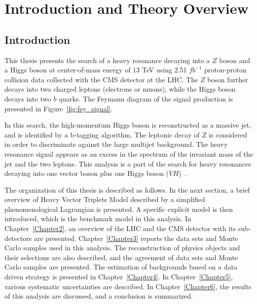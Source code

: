 
\newcommand{\tabhead}[1]{\textbf{#1}}
\newcommand{\mj}{$m_j$ }
\newcommand{\mzh}{$m_{ZH}$ }
\newcommand{\ttbar}{$t\bar{t}$ }
\newcommand{\Zjets}{$Z$+jets }
\newcommand{\Zee}{$Z\rightarrow e^+e^-$ }
\newcommand{\Zmm}{$Z\rightarrow \mu^+\mu^-$ }
\newcommand{\Hbb}{$H\rightarrow b\bar{b}$ }

\chapter{Introduction and Theory Overview} \label{Chapter1}

\section{Introduction}

This thesis presents the search of a heavy resonance decaying into a $Z$ boson and a Higgs boson at center-of-mass energy of 13 TeV using 2.51 $fb^{-1}$ proton-proton collision data collected with the CMS detector at the LHC. The $Z$ boson further decays into two charged leptons (electrons or muons), while the Higgs boson decays into two $b$ quarks. The Feymann diagram of the signal production is presented in Figure~\ref{fig:fey_signal}.

In this search, the high-momentum Higgs boson is reconstructed as a massive jet, and is identified by a b-tagging algorithm. The leptonic decay of $Z$ is considered in order to discriminate against the large multijet background. The heavy resonance signal appears as an excess in the spectrum of the invariant mass of the jet and the two leptons. This analysis is a part of the search for heavy resonances decaying into one vector boson plus one Higgs boson ($VH$)~\cite{Khachatryan:2016cfx}.

The organization of this thesis is described as follows. In the next section, a brief overview of Heavy Vector Triplets Model described by a simplified phenomenological Lagrangian is presented. A specific explicit model is then introduced, which is the benchmark model in this analysis. In Chapter~\ref{Chapter2}, an overview of the LHC and the CMS detector with its sub-detectors are presented. Chapter~\ref{Chapter3} reports the data sets and Monte Carlo samples used in this analysis. The reconstruction of physics objects and their selections are also described, and the agreement of data sets and Monte Carlo samples are presented. The estimation of backgrounds based on a data driven strategy is presented in Chapter~\ref{Chapter4}. In Chapter~\ref{Chapter5}, various systematic uncertainties are described. In Chapter~\ref{Chapter6}, the results of this analysis are discussed, and a conclusion is summarized.



